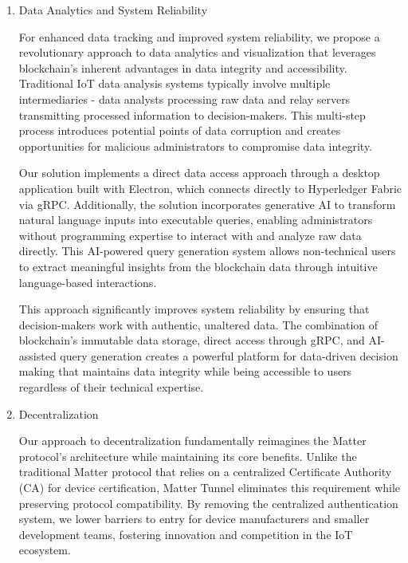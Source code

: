 \documentclass[conference]{IEEEtran}
\begin{document}
\begin{enumerate}[itemsep=2ex, parsep=1ex]
\begin{enumerate}[itemsep=2ex, parsep=1ex]
	      \end{enumerate}
	      
	\item Data Analytics and System Reliability
	      
	      For enhanced data tracking and improved system reliability, we propose a revolutionary approach to data analytics and visualization that leverages blockchain's inherent advantages in data integrity and accessibility. Traditional IoT data analysis systems typically involve multiple intermediaries - data analysts processing raw data and relay servers transmitting processed information to decision-makers. This multi-step process introduces potential points of data corruption and creates opportunities for malicious administrators to compromise data integrity.
	      
	      Our solution implements a direct data access approach through a desktop application built with Electron, which connects directly to Hyperledger Fabric via gRPC. Additionally, the solution incorporates generative AI to transform natural language inputs into executable queries, enabling administrators without programming expertise to interact with and analyze raw data directly. This AI-powered query generation system allows non-technical users to extract meaningful insights from the blockchain data through intuitive language-based interactions.
	      
	      This approach significantly improves system reliability by ensuring that decision-makers work with authentic, unaltered data. The combination of blockchain's immutable data storage, direct access through gRPC, and AI-assisted query generation creates a powerful platform for data-driven decision making that maintains data integrity while being accessible to users regardless of their technical expertise.
	      
	\item Decentralization
	      
	      Our approach to decentralization fundamentally reimagines the Matter protocol's architecture while maintaining its core benefits. Unlike the traditional Matter protocol that relies on a centralized Certificate Authority (CA) for device certification, Matter Tunnel eliminates this requirement while preserving protocol compatibility. By removing the centralized authentication system, we lower barriers to entry for device manufacturers and smaller development teams, fostering innovation and competition in the IoT ecosystem.
	      

\end{enumerate}
\end{document}
